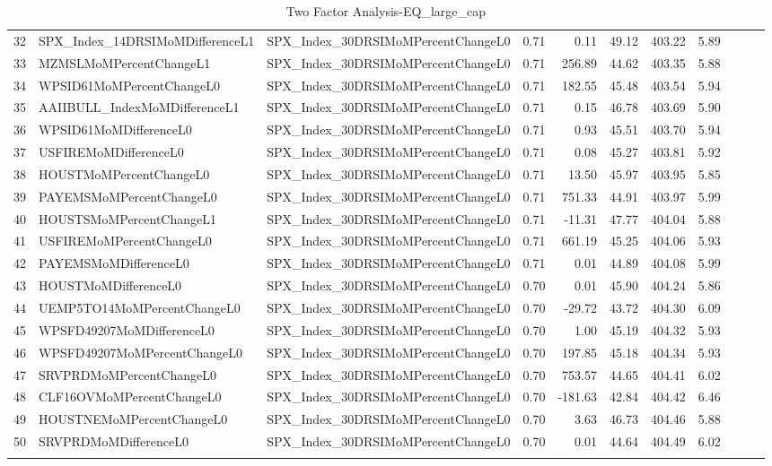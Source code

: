 \begin{longtable}{rllrrrrrlll}
  32 & SPX\_Index\_14DRSIMoMDifferenceL1 & SPX\_Index\_30DRSIMoMPercentChangeL0 & 0.71 & 0.11 & 49.12 & 403.22 & 5.89 &  &  &  \\ 
  33 & MZMSLMoMPercentChangeL1 & SPX\_Index\_30DRSIMoMPercentChangeL0 & 0.71 & 256.89 & 44.62 & 403.35 & 5.88 &  &  &  \\ 
  34 & WPSID61MoMPercentChangeL0 & SPX\_Index\_30DRSIMoMPercentChangeL0 & 0.71 & 182.55 & 45.48 & 403.54 & 5.94 &  &  &  \\ 
  35 & AAIIBULL\_IndexMoMDifferenceL1 & SPX\_Index\_30DRSIMoMPercentChangeL0 & 0.71 & 0.15 & 46.78 & 403.69 & 5.90 &  &  &  \\ 
  36 & WPSID61MoMDifferenceL0 & SPX\_Index\_30DRSIMoMPercentChangeL0 & 0.71 & 0.93 & 45.51 & 403.70 & 5.94 &  &  &  \\ 
  37 & USFIREMoMDifferenceL0 & SPX\_Index\_30DRSIMoMPercentChangeL0 & 0.71 & 0.08 & 45.27 & 403.81 & 5.92 &  &  &  \\ 
  38 & HOUSTMoMPercentChangeL0 & SPX\_Index\_30DRSIMoMPercentChangeL0 & 0.71 & 13.50 & 45.97 & 403.95 & 5.85 &  &  &  \\ 
  39 & PAYEMSMoMPercentChangeL0 & SPX\_Index\_30DRSIMoMPercentChangeL0 & 0.71 & 751.33 & 44.91 & 403.97 & 5.99 &  &  &  \\ 
  40 & HOUSTSMoMPercentChangeL1 & SPX\_Index\_30DRSIMoMPercentChangeL0 & 0.71 & -11.31 & 47.77 & 404.04 & 5.88 &  &  &  \\ 
  41 & USFIREMoMPercentChangeL0 & SPX\_Index\_30DRSIMoMPercentChangeL0 & 0.71 & 661.19 & 45.25 & 404.06 & 5.93 &  &  &  \\ 
  42 & PAYEMSMoMDifferenceL0 & SPX\_Index\_30DRSIMoMPercentChangeL0 & 0.71 & 0.01 & 44.89 & 404.08 & 5.99 &  &  &  \\ 
  43 & HOUSTMoMDifferenceL0 & SPX\_Index\_30DRSIMoMPercentChangeL0 & 0.70 & 0.01 & 45.90 & 404.24 & 5.86 &  &  &  \\ 
  44 & UEMP5TO14MoMPercentChangeL0 & SPX\_Index\_30DRSIMoMPercentChangeL0 & 0.70 & -29.72 & 43.72 & 404.30 & 6.09 &  &  &  \\ 
  45 & WPSFD49207MoMDifferenceL0 & SPX\_Index\_30DRSIMoMPercentChangeL0 & 0.70 & 1.00 & 45.19 & 404.32 & 5.93 &  &  &  \\ 
  46 & WPSFD49207MoMPercentChangeL0 & SPX\_Index\_30DRSIMoMPercentChangeL0 & 0.70 & 197.85 & 45.18 & 404.34 & 5.93 &  &  &  \\ 
  47 & SRVPRDMoMPercentChangeL0 & SPX\_Index\_30DRSIMoMPercentChangeL0 & 0.70 & 753.57 & 44.65 & 404.41 & 6.02 &  &  &  \\ 
  48 & CLF16OVMoMPercentChangeL0 & SPX\_Index\_30DRSIMoMPercentChangeL0 & 0.70 & -181.63 & 42.84 & 404.42 & 6.46 &  &  &  \\ 
  49 & HOUSTNEMoMPercentChangeL0 & SPX\_Index\_30DRSIMoMPercentChangeL0 & 0.70 & 3.63 & 46.73 & 404.46 & 5.88 &  &  &  \\ 
  50 & SRVPRDMoMDifferenceL0 & SPX\_Index\_30DRSIMoMPercentChangeL0 & 0.70 & 0.01 & 44.64 & 404.49 & 6.02 &  &  &  \\ 
   \hline
\hline
\caption{Two Factor Analysis-EQ_large_cap} 
\end{longtable}
